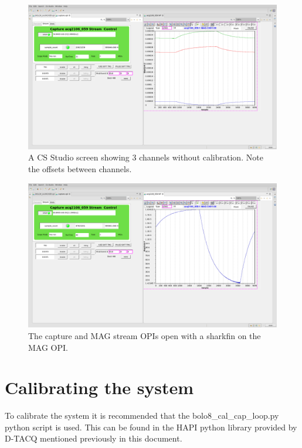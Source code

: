 \documentclass{article}
\begin{document}
\begin{figure} [hbt!]
	\centering
	\includegraphics[width=5.0in]{images/3-fin-no-cal.png}
	\caption{A CS Studio screen showing 3 channels without calibration. Note the offsets between channels.}
	\label{bolocss3finnocal}
\end{figure}

\begin{figure} [hbt!]
	\centering
	\includegraphics[width=5.0in]{images/1-fin-no-cal.png}
	\caption{The capture and MAG stream OPIs open with a sharkfin on the MAG OPI.}
	\label{bolocsscapture}
\end{figure}

\newpage

\section{Calibrating the system} \label{calibrating}
To calibrate the system it is recommended that the bolo8\_cal\_cap\_loop.py python script is used.
This can be found in the HAPI python library provided by D-TACQ mentioned previously in this document.
\end{document}
